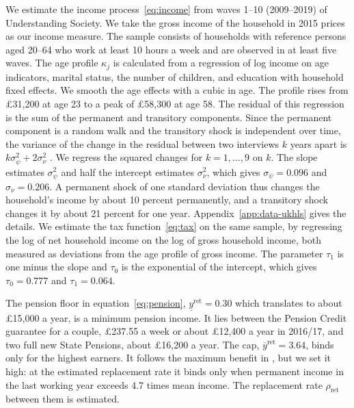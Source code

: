 We estimate the income process~\eqref{eq:income} from waves 1--10
(2009--2019) of Understanding Society.
We take the gross income of the household in 2015 prices as our income measure. The sample consists of households with reference persons aged 20--64 who work at least 10
hours a week and are observed in at least five waves. The age profile $\kappa_j$ is calculated from a regression of log income
on age indicators, marital status, the number of children, and education
with household  fixed effects. We smooth the age effects with a cubic in
age. The profile rises from \pounds31,200 at age 23 to a peak of
\pounds58,300 at age 58. The residual of this regression is the sum of the
permanent and transitory components. Since the permanent component is a
random walk and the transitory shock is independent over time, the
variance of the change in the residual between two interviews $k$ years
apart is $k\sigma_\psi^2+2\sigma_\nu^2$ \citep{carroll1997nature}. We
regress the squared changes for $k=1,\dots,9$ on $k$. The slope estimates
$\sigma_\psi^2$ and half the intercept estimates $\sigma_\nu^2$, which
gives $\sigma_\psi=0.096$ and $\sigma_\nu=0.206$. A permanent shock of one
standard deviation thus changes the household's income by about 10 percent
permanently, and a transitory shock changes it by
about 21 percent for one year. Appendix~\ref{app:data-ukhls} gives the
details. We estimate the tax function~\eqref{eq:tax} on the same sample, by regressing the log of net household income on the log of gross household income, both measured as deviations from the age profile of gross income. The parameter $\tau_1$ is one minus the slope and $\tau_0$ is the exponential of the intercept, which gives $\tau_0=0.777$ and $\tau_1=0.064$.

The pension floor in equation~\eqref{eq:pension},
$\underline y^{\mathrm{ret}}=0.30$ which translates to about \pounds15,000 a year,  is a minimum pension income. It lies between the Pension Credit guarantee for a couple, \pounds237.55 a week or about \pounds12,400 a year in 2016/17, and two full new State Pensions, about \pounds16,200 a year. The
cap, $\overline y^{\mathrm{ret}}=3.64$, binds only for the highest earners. It follows the maximum benefit in \citet{kinnerud2025effects}, but we set it high: at the estimated replacement rate it binds only when permanent income in the last working year exceeds 4.7 times mean income.
The replacement rate $\rho_{\mathrm{ret}}$ between them is estimated.



